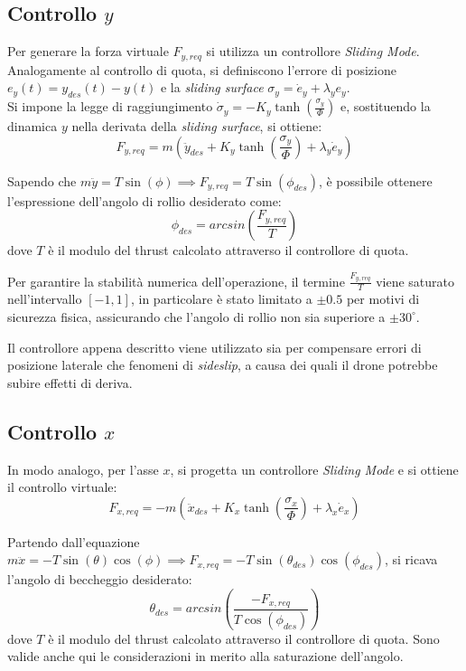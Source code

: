 \subsection{Controllo \texorpdfstring{$y$}{y}}
Per generare la forza virtuale $F_{y,req}$ si utilizza un controllore \textit{Sliding Mode}.
Analogamente al controllo di quota, si definiscono l'errore di posizione $e_y(t) = y_{des}(t) - y(t)$ e la \textit{sliding surface} $\sigma_y = \dot{e}_y + \lambda_y e_y$.\\
Si impone la legge di raggiungimento $\dot{\sigma}_y = - K_y \tanh\left(\frac{\sigma_y}{\Phi}\right)$ e, sostituendo la dinamica $y$ nella derivata della \textit{sliding surface}, si ottiene:
\begin{equation}
    F_{y,req} = m \left(\ddot{y}_{des} + K_y \tanh\left(\frac{\sigma_y}{\Phi}\right) + \lambda_y \dot{e}_y \right)
\end{equation}

Sapendo che $m \ddot{y} = T\sin(\phi) \implies F_{y,req} = T\sin(\phi_{des})$, è possibile ottenere l'espressione dell'angolo di rollio desiderato come:
\begin{equation}
    \phi_{des} = arcsin\left(\frac{F_{y,req}}{T} \right)
\end{equation}
dove $T$ è il modulo del thrust calcolato attraverso il controllore di quota.

Per garantire la stabilità numerica dell'operazione, il termine $\frac{F_{y,req}}{T}$ viene saturato nell'intervallo $[-1, 1]$, 
in particolare è stato limitato a $\pm 0.5$ per motivi di sicurezza fisica, assicurando che l'angolo di rollio non sia superiore a $\pm30^\circ$.

Il controllore appena descritto viene utilizzato sia per compensare errori di posizione laterale che fenomeni di 
\textit{sideslip}, a causa dei quali il drone potrebbe subire effetti di deriva.

\subsection{Controllo \texorpdfstring{$x$}{x}}
In modo analogo, per l'asse $x$, si progetta un controllore \textit{Sliding Mode} e si ottiene il controllo virtuale:
\begin{equation}
    F_{x,req} = -m \left(\ddot{x}_{des} + K_x \tanh\left(\frac{\sigma_x}{\Phi}\right) + \lambda_x \dot{e}_x \right)
\end{equation}

Partendo dall'equazione $m \ddot{x} = -T\sin(\theta)\cos(\phi) \implies F_{x,req} = -T\sin(\theta_{des})\cos(\phi_{des})$, si ricava l'angolo di beccheggio desiderato:
\begin{equation}
    \theta_{des} = arcsin\left(\frac{-F_{x,req}}{T\cos(\phi_{des})} \right)
\end{equation}
dove $T$ è il modulo del thrust calcolato attraverso il controllore di quota. Sono valide anche qui le considerazioni in merito alla saturazione dell'angolo.

